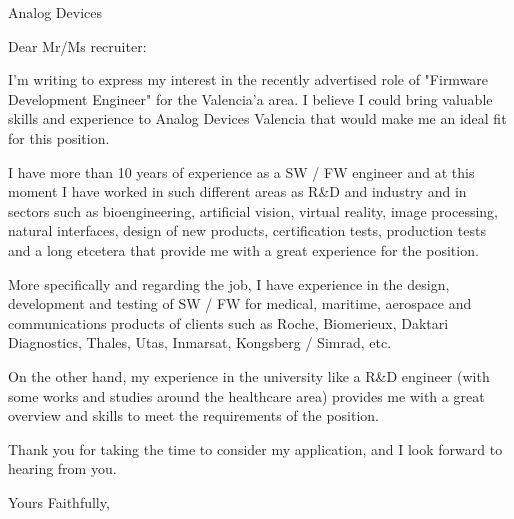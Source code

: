 \documentclass{letter}
\begin{document}
\begin{letter}{Analog Devices}
\opening{Dear Mr/Ms recruiter:}



I'm writing to express my interest in the recently advertised role of "Firmware Development Engineer" for the Valencia'a area. I believe I could bring valuable skills and experience to Analog Devices Valencia that would make me an ideal fit for this position.

I have more than 10 years of experience as a SW / FW engineer and at this moment I have worked in such different areas as R\&D and industry and in sectors such as bioengineering, artificial vision, virtual reality, image processing, natural interfaces, design of new products, certification tests, production tests and a long etcetera that provide me with a great experience for the position.

More specifically and regarding the job, I have experience in the design, development and testing of SW / FW for medical, maritime, aerospace and communications products of clients such as Roche, Biomerieux, Daktari Diagnostics, Thales, Utas, Inmarsat, Kongsberg / Simrad, etc.

On the other hand, my experience in the university like a R\&D engineer (with some works and studies around the healthcare area) provides me with a great overview and skills to meet the requirements of the position.

Thank you for taking the time to consider my application, and I look forward to hearing from you.


\closing{Yours Faithfully,}


\end{letter}
\end{document}

